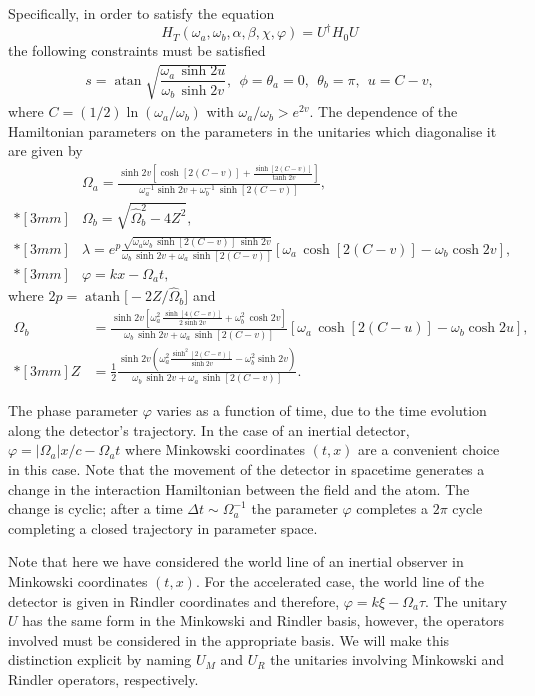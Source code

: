 Specifically, in order to satisfy the equation
\[H_{T}(\omega_a,\omega_b,\alpha,\beta,\chi,\varphi)=U^{\dagger}H_0U\]
the following constraints must be satisfied
\begin{align*}\label{constr}
s=\operatorname{atan}\sqrt{\dfrac{\omega_a\,\sinh 2u}{\omega_b\,\sinh 2v}},\;\, \phi=\theta_a\!=  0,\;\,\theta_b=\!\pi,\;\, u=C-v,
\end{align*}
where $C=(1/2)\ln\left(\omega_a/\omega_b\right)$ with  $\omega_a/\omega_b>e^{2v}$.
The dependence of the Hamiltonian parameters on the parameters in the unitaries which diagonalise it are given by
\begin{align}&\Omega_a=\frac{\sinh 2v\left[\cosh \left[2(C-v)\right] +\frac{\sinh\left[2(C-v)\right]}{\tanh 2v}\right]}{{\omega_a^{-1}}\sinh 2v+\omega_b^{-1}\,\sinh \left[2(C-v)\right]},\\*[3mm]
&\Omega_b = \sqrt{\hat\Omega_b^2-4Z^2},\\*[3mm]
&\lambda=e^{p 
}\frac{\sqrt{\omega_a\omega_b\,\sinh [2(C-v)]\,\sinh 2v}}{\omega_b\,\sinh 2v+\omega_a\,\sinh [2(C-v)]}\left[\omega_a\,\cosh \left[2(C-v)\right] - \omega_b\cosh 2v\right],\\*[3mm]
&\varphi = kx-\Omega_a t,
\end{align}
where $2p=\operatorname{atanh}\big[-2Z/\hat \Omega_b\big]$ and
\begin{align}
\hat\Omega_b&= \frac{\sinh 2v\left[\omega_a^2\, \frac{\sinh \left[4\left(C-v\right)\right]}{2\sinh 2v}+\omega_b^2\,\cosh 2v\right]}{\omega_b\,\sinh 2v+\omega_a\,\sinh [2(C-v)]}\left[\omega_a\,\cosh \left[2(C-u)\right] - \omega_b\cosh 2u\right],\\*[3mm]
Z&=\frac12 \frac{\sinh 2v\left(\omega^2_a\frac{\sinh^2 \left[2(C-v)\right]}{\sinh 2v}- \omega_b^2 \sinh 2v\right)}{\omega_b\,\sinh 2v+\omega_a\,\sinh [2(C-v)]}.
\end{align}

The phase parameter $\varphi$ varies as a function of time, due to the time evolution along the detector's trajectory.  In the case of an inertial detector, $\varphi=|\Omega_a|x/c-\Omega_a t$ where Minkowski coordinates $(t,x)$ are a convenient choice in this case. Note that the movement of the detector in spacetime generates a change in the interaction Hamiltonian between the field and the atom. The change is cyclic; after a time $\Delta t\sim\Omega_a^{-1}$ the parameter $\varphi$ completes a $2\pi$ cycle completing a closed trajectory in parameter space.

Note that here we have considered the world line of an inertial observer in Minkowski coordinates $(t,x)$. For the accelerated case, the world line of the detector is given in Rindler coordinates and therefore, $\varphi = k\xi-\Omega_a \tau$.  The unitary $U$ has the same form in the Minkowski and Rindler basis, however, the operators involved must be considered in the appropriate basis. We will make this distinction explicit by naming $U_M$ and $U_R$ the unitaries involving Minkowski and Rindler operators, respectively.


